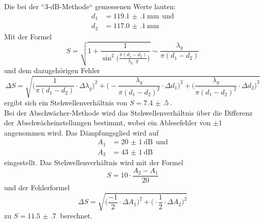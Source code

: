 Die bei der “3-dB-Methode“ gemessenen Werte lauten:
 \begin{align*}
   d_\text{1}&=\SI{119.1(1)}{\mm} \:\:\text{und}\\
   d_\text{2}&=\SI{117.0(1)}{\mm}
 \end{align*}
 Mit der Formel
 \begin{equation}
   S=\sqrt{1+\frac{1}{\sin^2\Big(\frac{\pi (d_1 - d_2)}{\lambda_g \cdot g}\Big)}}\sim\frac{\lambda_g}{\pi (d_1 - d_2)}
 \end{equation}
 und dem dazugehörigen Fehler
 \begin{equation}
   \Delta S=\sqrt{\Big(\frac{1}{\pi(d_1 - d_2)}\cdot\Delta\lambda_g\Big)^2+\Big(-\frac{\lambda_g}{\pi{(d_1 - d_2)^2}}\cdot\Delta d_1\Big)^2+
   \Big(\frac{\lambda_g}{\pi(d_1 - d_2)^2}\cdot\Delta d_2\Big)^2}
 \end{equation}
 ergibt sich ein Stehwellenverhältnis von $S=\SI{7.4(5)}{}$.\\

 Bei der Abschwächer-Methode wird das Stehwellenverhältnis über die Differenz der Abschwächeinstellungen bestimmt, wobei
 ein Ablesefehler von $\pm 1$ angenommen wird.
 Das Dämpfungsglied wird auf
 \begin{align*}
   A_1&=\SI{20(1)}{\dB} \:\:\text{und}\\
   A_2&=\SI{43(1)}{\dB}
 \end{align*}
 eingestellt. Das Stehwellenverhältnis wird mit der Formel
 \begin{equation}
   S=10\cdot\frac{A_2 - A_1}{20}
 \end{equation}
 und der Fehlerformel
 \begin{equation}
   \Delta S=\sqrt{\Big(\frac{-1}{2}\cdot\Delta A_1\Big)^2+\Big(\cdot{\frac{1}{2}\cdot\Delta A_2}\Big)^2  }
 \end{equation}
zu $S=\SI{11.5(7)}{}$ berechnet.
